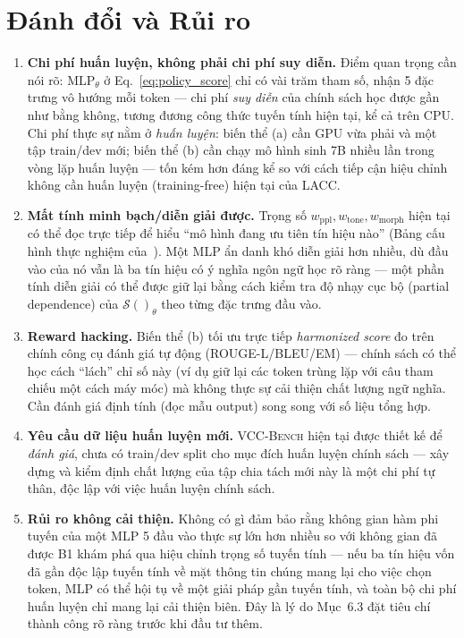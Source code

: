 \documentclass[12pt,a4paper]{article}
\newcommand{\score}[1]{\mathcal{S}(#1)}      %
\newcommand{\method}[1]{\textsc{#1}}         %
\begin{document}
\section{Đánh đổi và Rủi ro}
\label{sec:tradeoffs}

\begin{enumerate}[label=\textbf{R\arabic*}:,leftmargin=*]
    \item \textbf{Chi phí huấn luyện, không phải chi phí suy diễn.} Điểm quan trọng cần nói rõ: $\text{MLP}_\theta$ ở Eq.~\ref{eq:policy_score} chỉ có vài trăm tham số, nhận 5 đặc trưng vô hướng mỗi token --- chi phí \emph{suy diễn} của chính sách học được gần như bằng không, tương đương công thức tuyến tính hiện tại, kể cả trên CPU. Chi phí thực sự nằm ở \emph{huấn luyện}: biến thể (a) cần GPU vừa phải và một tập train/dev mới; biến thể (b) cần chạy mô hình sinh 7B nhiều lần trong vòng lặp huấn luyện --- tốn kém hơn đáng kể so với cách tiếp cận hiệu chỉnh không cần huấn luyện (training-free) hiện tại của \method{LACC}.
    \item \textbf{Mất tính minh bạch/diễn giải được.} Trọng số $w_{\text{ppl}}, w_{\text{tone}}, w_{\text{morph}}$ hiện tại có thể đọc trực tiếp để hiểu ``mô hình đang ưu tiên tín hiệu nào'' (Bảng cấu hình thực nghiệm của~\cite{lacc2026}). Một MLP ẩn danh khó diễn giải hơn nhiều, dù đầu vào của nó vẫn là ba tín hiệu có ý nghĩa ngôn ngữ học rõ ràng --- một phần tính diễn giải có thể được giữ lại bằng cách kiểm tra độ nhạy cục bộ (partial dependence) của $\score{}_\theta$ theo từng đặc trưng đầu vào.
    \item \textbf{Reward hacking.} Biến thể (b) tối ưu trực tiếp \textit{harmonized score} đo trên chính công cụ đánh giá tự động (ROUGE-L/BLEU/EM) --- chính sách có thể học cách ``lách'' chỉ số này (ví dụ giữ lại các token trùng lặp với câu tham chiếu một cách máy móc) mà không thực sự cải thiện chất lượng ngữ nghĩa. Cần đánh giá định tính (đọc mẫu output) song song với số liệu tổng hợp.
    \item \textbf{Yêu cầu dữ liệu huấn luyện mới.} \method{VCC-Bench} hiện tại được thiết kế để \emph{đánh giá}, chưa có train/dev split cho mục đích huấn luyện chính sách --- xây dựng và kiểm định chất lượng của tập chia tách mới này là một chi phí tự thân, độc lập với việc huấn luyện chính sách.
    \item \textbf{Rủi ro không cải thiện.} Không có gì đảm bảo rằng không gian hàm phi tuyến của một MLP 5 đầu vào thực sự lớn hơn nhiều so với không gian đã được B1 khám phá qua hiệu chỉnh trọng số tuyến tính --- nếu ba tín hiệu vốn đã gần độc lập tuyến tính về mặt thông tin chúng mang lại cho việc chọn token, MLP có thể hội tụ về một giải pháp gần tuyến tính, và toàn bộ chi phí huấn luyện chỉ mang lại cải thiện biên. Đây là lý do Mục~6.3 đặt tiêu chí thành công rõ ràng trước khi đầu tư thêm.

\end{enumerate}
\end{document}
